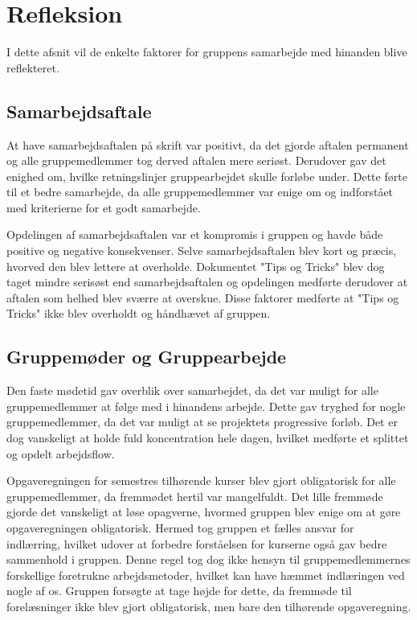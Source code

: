 \section{Refleksion}
I dette afsnit vil de enkelte faktorer for gruppens samarbejde med hinanden blive reflekteret.

\subsection{Samarbejdsaftale}
At have samarbejdsaftalen på skrift var positivt, da det gjorde aftalen permanent og alle gruppemedlemmer tog derved aftalen mere seriøst. Derudover gav det enighed om, hvilke retningslinjer gruppearbejdet skulle forløbe under. Dette førte til et bedre samarbejde, da alle gruppemedlemmer var enige om og indforstået med kriterierne for et godt samarbejde.

Opdelingen af samarbejdsaftalen var et kompromis i gruppen og havde både positive og negative konsekvenser. Selve samarbejdsaftalen blev kort og præcis, hvorved den blev lettere at overholde. Dokumentet "Tips og Tricks" blev dog taget mindre serisøst end samarbejdsaftalen og opdelingen medførte derudover at aftalen som helhed blev sværre at overskue. Disse faktorer medførte at "Tips og Tricks" ikke blev  overholdt og håndhævet af gruppen.

\subsection{Gruppemøder og Gruppearbejde}
Den faste mødetid gav overblik over samarbejdet, da det var muligt for alle gruppemedlemmer at følge med i hinandens arbejde. Dette gav tryghed for nogle gruppemedlemmer, da det var muligt at se projektets progressive forløb. Det er dog vanskeligt at holde fuld koncentration hele dagen, hvilket medførte et splittet og opdelt arbejdsflow.

Opgaveregningen for semestres tilhørende kurser blev gjort obligatorisk for alle gruppemedlemmer, da fremmødet hertil var mangelfuldt. Det lille fremmøde gjorde det vanskeligt at løse opagverne, hvormed gruppen blev enige om at gøre opgaveregningen obligatorisk. Hermed tog gruppen et fælles ansvar for indlærring, hvilket udover at forbedre forståelsen for kurserne også gav bedre sammenhold i gruppen. Denne regel tog dog ikke hensyn til gruppemedlemmernes forskellige foretrukne arbejdsmetoder, hvilket kan have hæmmet indlæringen ved nogle af os. Gruppen forsøgte at tage højde for dette, da fremmøde til forelæsninger ikke blev gjort obligatorisk, men bare den tilhørende opgaveregning.

